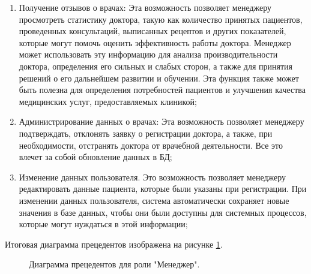         \begin{enumerate}
            \item Получение отзывов о врачах: Эта возможность позволяет менеджеру %
            просмотреть статистику доктора, такую как количество принятых пациентов, %
            проведенных консультаций, выписанных рецептов и других показателей, которые %
            могут помочь оценить эффективность работы доктора. Менеджер может использовать %
            эту информацию для анализа производительности доктора, определения его сильных и %
            слабых сторон, а также для принятия решений о его дальнейшем развитии и обучении. %
            Эта функция также может быть полезна для определения потребностей пациентов и %
            улучшения качества медицинских услуг, предоставляемых клиникой;
            \item Администрирование данных о врачах: Эта возможность позволяет %
             менеджеру подтверждать, отклонять заявку о регистрации доктора, %
             а также, при необходимости, отстранять доктора от врачебной деятельности. %
             Все это влечет за собой обновление данных в БД;
            \item Изменение данных пользователя. Это возможность позволяет менеджеру %
            редактировать данные пациента, которые были указаны при регистрации. %
            При изменении данных пользователя, система автоматически сохраняет новые %
            значения в базе данных, чтобы они были доступны для системных процессов, %
            которые могут нуждаться в этой информации;
        \end{enumerate}
    
        Итоговая диаграмма прецедентов изображена на рисунке \ref{manager_uml}.

        \begin{figure}[H]%
            \centering
            \caption{Диаграмма прецедентов для роли "Менеджер".} \label{manager_uml}
        \end{figure} 